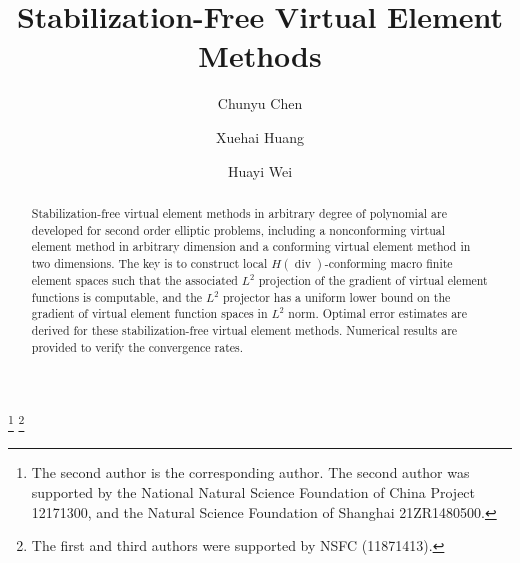 \documentclass[10pt]{amsart}
\renewcommand{\div}{\operatorname{div}}
\numberwithin{equation}{section}
\begin{document}
\title[Stabilization-Free VEM]{Stabilization-Free Virtual Element Methods}
\author{Chunyu Chen}%
\address{Hunan Key Laboratory for Computation and Simulation in Science and Engineering; School of Mathematics and Computational Science, Xiangtan University, Xiangtan 411105, P.R.China }%
 \author{Xuehai Huang}%
 \address{School of Mathematics, Shanghai University of Finance and Economics, Shanghai 200433, China}%
\author{Huayi Wei}%
\address{Hunan Key Laboratory for Computation and Simulation in Science and Engineering; School of Mathematics and Computational Science, Xiangtan University, Xiangtan 411105, P.R.China }%

 \thanks{The second author is the corresponding author. The second author was supported by the National Natural Science Foundation of China Project 12171300, and the Natural Science Foundation of Shanghai 21ZR1480500.}
 \thanks{The first and third authors were supported by NSFC (11871413).}

\makeatletter
{}
\makeatother
{}


\begin{abstract}
Stabilization-free virtual element methods in arbitrary degree of polynomial are developed for second order elliptic problems, including a nonconforming virtual element method in arbitrary dimension and a conforming virtual element method in two dimensions.
The key is to construct local $H(\div)$-conforming macro finite element spaces such that the associated $L^2$ projection of the gradient of virtual element functions is computable, and the $L^2$ projector has a uniform lower bound on the gradient of virtual element function spaces in $L^2$ norm.
Optimal error estimates are derived for these stabilization-free virtual element methods.
Numerical results are provided to verify the convergence rates.
\end{abstract}
\end{document}

